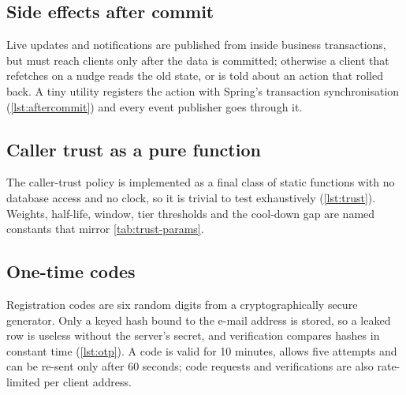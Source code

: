 

\subsection{Side effects after commit}\label{sec:impl-aftercommit}
Live updates and notifications are published from inside business transactions, but must reach clients only after the
data is committed; otherwise a client that refetches on a nudge reads the old state, or is told about an action that
rolled back. A tiny utility registers the action with Spring's transaction synchronisation (\cref{lst:aftercommit}) and
every event publisher goes through it.



\subsection{Caller trust as a pure function}
The caller-trust policy is implemented as a final class of static functions with no database access and no clock, so it
is trivial to test exhaustively (\cref{lst:trust}). Weights, half-life, window, tier thresholds and the cool-down
gap are named constants that mirror \cref{tab:trust-params}.



\subsection{One-time codes}
Registration codes are six random digits from a cryptographically secure generator. Only a keyed hash bound to the
e-mail address is stored, so a leaked row is useless without the server's secret, and verification compares hashes in
constant time (\cref{lst:otp}). A code is valid for 10 minutes, allows five attempts and can be re-sent only after 60 seconds;
code requests and verifications are also rate-limited per client address.



